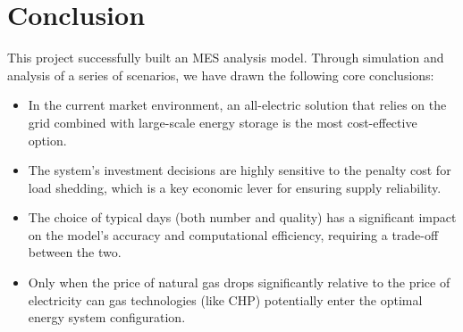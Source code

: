 \documentclass[12pt, a4paper]{article}
\begin{document}
\section{Conclusion}
This project successfully built an MES analysis model. Through simulation and analysis of a series of scenarios, we have drawn the following core conclusions:
\begin{itemize}
	\item In the current market environment, an all-electric solution that relies on the grid combined with large-scale energy storage is the most cost-effective option.
	\item The system's investment decisions are highly sensitive to the penalty cost for load shedding, which is a key economic lever for ensuring supply reliability.
	\item The choice of typical days (both number and quality) has a significant impact on the model's accuracy and computational efficiency, requiring a trade-off between the two.
	\item Only when the price of natural gas drops significantly relative to the price of electricity can gas technologies (like CHP) potentially enter the optimal energy system configuration.
\end{itemize}
\end{document}
